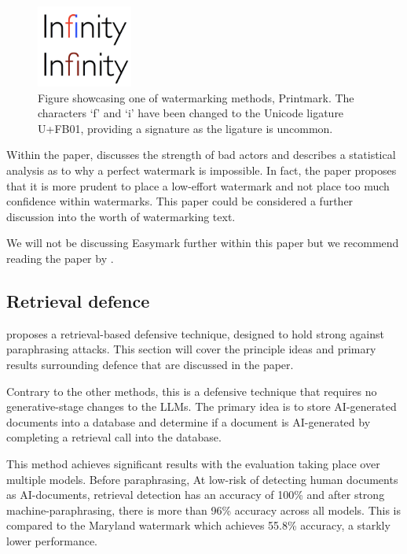 \documentclass{l4proj}
\theoremstyle{definition}
\begin{document}
        \begin{figure}[ht]
            \centering
            \includegraphics[width=1\linewidth, height=2.7cm, keepaspectratio]{images/background/inf-ligature.png}
            \caption{Figure showcasing one of watermarking methods, Printmark. The characters `f' and `i' have been changed to the Unicode ligature U+FB01, providing a signature as the ligature is uncommon.}
            \label{fig:fi-ligature}
            \nocite{infinity-ligatures-pict}
        \end{figure}

        Within the paper, \citet{sato2023embarrassingly} discusses the strength of bad actors and describes a statistical analysis as to why a perfect watermark is impossible. In fact, the paper proposes that it is more prudent to place a low-effort watermark and not place too much confidence within watermarks. This paper could be considered a further discussion into the worth of watermarking text.

        We will not be discussing Easymark further within this paper but we recommend reading the paper by \citet{sato2023embarrassingly}.
    \subsection{Retrieval defence}
        \citet{krishna2023paraphrasing} proposes a retrieval-based defensive technique, designed to hold strong against paraphrasing attacks. This section will cover the principle ideas and primary results surrounding defence that are discussed in the paper. 

        Contrary to the other methods, this is a defensive technique that requires no generative-stage changes to the LLMs. The primary idea is to store AI-generated documents into a database and determine if a document is AI-generated by completing a retrieval call into the database.

        This method achieves significant results with the evaluation taking place over multiple models. Before paraphrasing, At low-risk of detecting human documents as AI-documents, retrieval detection has an accuracy of 100\% and after strong machine-paraphrasing, there is more than 96\% accuracy across all models. This is compared to the Maryland watermark which achieves 55.8\% accuracy, a starkly lower performance.
        
\end{document}
